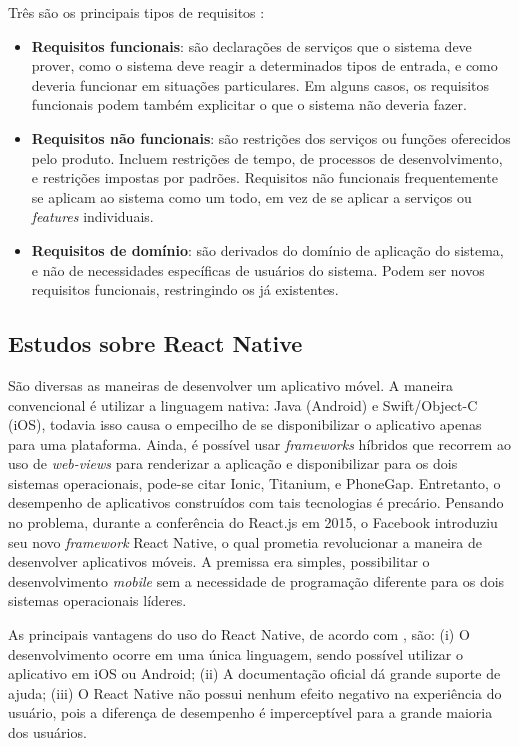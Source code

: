 Três são os principais tipos de requisitos \citep{Sommervile2010}:
\begin{itemize}
    \item \textbf{Requisitos funcionais}: são declarações de serviços que o sistema deve prover, como o sistema deve reagir a determinados tipos de entrada, e como deveria funcionar em situações particulares. Em alguns casos, os requisitos funcionais podem também explicitar o que o sistema não deveria fazer.
    
    \item \textbf{Requisitos não funcionais}: são restrições dos serviços ou funções oferecidos pelo produto. Incluem restrições de tempo, de processos de desenvolvimento, e restrições impostas por padrões. Requisitos não funcionais frequentemente se aplicam ao sistema como um todo, em vez de se aplicar a serviços ou \textit{features} individuais.
    
    \item \textbf{Requisitos de domínio}: são derivados do domínio de aplicação do sistema, e não de necessidades específicas de usuários do sistema. Podem ser novos requisitos funcionais, restringindo os já existentes. 
\end{itemize}


\subsection{Estudos sobre React Native} 
São diversas as maneiras de desenvolver um aplicativo móvel. A maneira convencional é utilizar a linguagem nativa: Java (Android) e Swift/Object-C (iOS), todavia isso causa o empecilho de se disponibilizar o aplicativo apenas para uma plataforma. Ainda, é possível usar \textit{frameworks} híbridos que recorrem ao uso de \textit{web-views} para renderizar a aplicação e disponibilizar para os dois sistemas operacionais, pode-se citar Ionic, Titanium, e PhoneGap. Entretanto, o desempenho de aplicativos construídos com tais tecnologias é precário. Pensando no problema, durante a conferência do React.js em 2015, o Facebook introduziu seu novo \textit{framework} React Native, o qual prometia revolucionar a maneira de desenvolver aplicativos móveis. A premissa era simples, possibilitar o desenvolvimento \textit{mobile} sem a necessidade de programação diferente para os dois sistemas operacionais líderes.

As principais vantagens do uso do React Native, de acordo com \cite{danielsson2016}, são: (i) O desenvolvimento ocorre em uma única linguagem, sendo possível utilizar o aplicativo em iOS ou Android; (ii) A documentação oficial dá grande suporte de ajuda; (iii) O React Native não possui nenhum efeito negativo na experiência do usuário, pois a diferença de desempenho é imperceptível para a grande maioria dos usuários.

